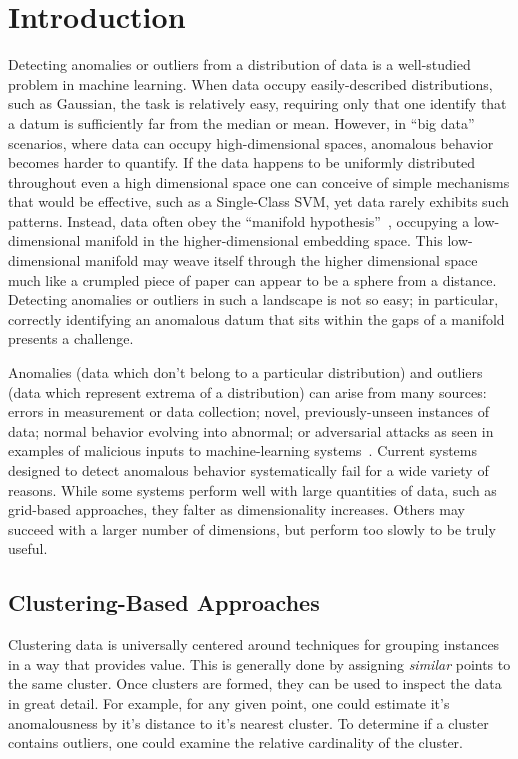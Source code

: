 \section{Introduction}
\label{sec:introduction}

Detecting anomalies or outliers from a distribution of data is a well-studied problem in machine learning.
When data occupy easily-described distributions, such as Gaussian, the task is relatively easy, requiring only that one identify that a datum is sufficiently far from the median or mean. 
However, in ``big data'' scenarios, where data can occupy high-dimensional spaces, anomalous behavior becomes harder to quantify.
If the data happens to be uniformly distributed throughout even a high dimensional space one can conceive of simple mechanisms that would be effective, such as a Single-Class SVM, yet data rarely exhibits such patterns.
Instead, data often obey the ``manifold hypothesis''~\cite{fefferman2016testing}, occupying a low-dimensional manifold in the higher-dimensional embedding space.
This low-dimensional manifold may weave itself through the higher dimensional space much like a crumpled piece of paper can appear to be a sphere from a distance.
Detecting anomalies or outliers in such a landscape is not so easy; in particular, correctly identifying an anomalous datum that sits within the gaps of a manifold presents a challenge.

Anomalies (data which don't belong to a particular distribution) and outliers (data which represent extrema of a distribution) can arise from many sources: errors in measurement or data collection; novel, previously-unseen instances of data; normal behavior evolving into abnormal; or adversarial attacks as seen in examples of malicious inputs to machine-learning systems~\cite{schoolbus-ostrich}.
Current systems designed to detect anomalous behavior systematically fail for a wide variety of reasons.
While some systems perform well with large quantities of data, such as grid-based approaches, they falter as dimensionality increases.
Others may succeed with a larger number of dimensions, but perform too slowly to be truly useful.

\subsection{Clustering-Based Approaches}

Clustering data is universally centered around techniques for grouping instances in a way that provides value.
This is generally done by assigning \textit{similar} points to the same cluster.
Once clusters are formed, they can be used to inspect the data in great detail.
For example, for any given point, one could estimate it's anomalousness by it's distance to it's nearest cluster.
To determine if a cluster contains outliers, one could examine the relative cardinality of the cluster.

